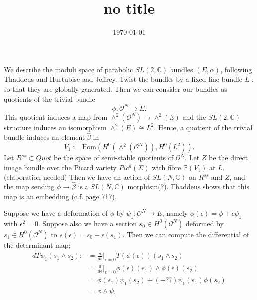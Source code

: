 \documentclass[]{article}
\title{no title}
\date{\today}
\newcommand{\C}{\mathbb{C}}
\newcommand{\Hom}{\text{Hom}}
\newcommand{\OO}{\mathcal{O}}
\newcommand{\PP}{\mathbb{P}}
\begin{document}
	We describe the moduli space of parabolic $SL(2,\C)$ bundles $(E,\alpha)$, following Thaddeus and Hurtubise and Jeffrey. Twist the bundles by a fixed line bundle $L$ , so that they are globally generated. Then we can consider our bundles as quotients of the trivial bundle
	\begin{equation}
		\phi:\OO^N \to E.
	\end{equation}
	This quotient induces a map from $\wedge^2(\OO^N) \to \wedge^2(E)$ and the $SL(2,\C)$ structure induces an isomorphism $\wedge^2(E)\cong L^2$. Hence, a quotient of the trivial bundle induces an element $\hat{\beta}$ in 
	\begin{equation}
		V_1 := \Hom(H^0(\wedge^2(\OO^N)), H^0(L^2)).
	\end{equation}
	Let $R^{ss}\subset Quot$ be the space of semi-stable quotients of $\OO^N$. Let $Z$ be the direct image bundle over the Picard variety $Pic^d(\Sigma)$ with fibre $\PP(V_1)$ at $L$. (elaboration needed)  Then we have an action of $SL(N,\C)$ on $R^{ss}$ and $Z$, and the map sending $\phi \to \hat{\beta}$ is a $SL(N,\C)$ morphism(?). Thaddeus shows that this map is an embedding (c.f. page 717).
	
	Suppose we have a deformation of $\phi$ by $\psi_1:\OO^N \to E$, namely $\phi(\epsilon) = \phi + \epsilon\psi_1$ with $\epsilon^2=0$. Suppose also we have a section $s_0 \in H^0(\OO^N)$ deformed by $s_1 \in H^0(\OO^N)$ to $s(\epsilon) = s_0 + \epsilon(s_1)$. Then we can compute the differential of the determinant map;
	\begin{align*}
		dT\psi_1(s_1\wedge s_2) :&= \frac{d}{d\epsilon}|_{\epsilon=0} T(\phi(\epsilon))(s_1\wedge s_2)\\
		&=\frac{d}{d\epsilon}|_{\epsilon=0}\phi(\epsilon)(s_1)\wedge \phi(\epsilon)(s_2)\\
		&= \phi(s_1) \psi_1(s_2) +(-??) \psi_1(s_1)\phi(s_2)\\
		&= \phi\wedge \psi_1
	\end{align*}
	
\end{document}
